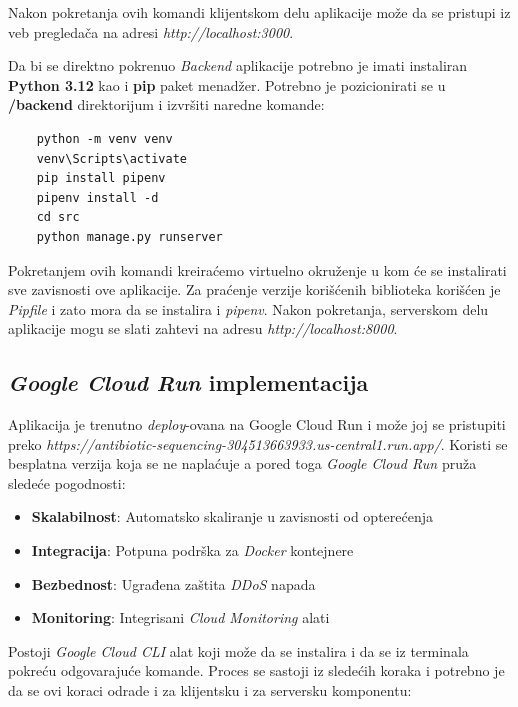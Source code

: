 \documentclass[12pt,oneside]{memoir}
\begin{document}
Nakon pokretanja ovih komandi klijentskom delu aplikacije može da se pristupi iz veb pregledača na adresi \emph{http://localhost:3000}.

Da bi se direktno pokrenuo \emph{Backend} aplikacije potrebno je imati instaliran \textbf{Python 3.12} kao i \textbf{pip} paket menadžer. Potrebno je pozicionirati se u \textbf{/backend} direktorijum i izvršiti naredne komande:  
\begin{verbatim}
    python -m venv venv
    venv\Scripts\activate
    pip install pipenv
    pipenv install -d
    cd src
    python manage.py runserver
\end{verbatim}

Pokretanjem ovih komandi kreiraćemo virtuelno okruženje u kom će se instalirati sve zavisnosti ove aplikacije. Za praćenje verzije korišćenih biblioteka korišćen je \emph{Pipfile} i zato mora da se instalira i \emph{pipenv}.
Nakon pokretanja, serverskom delu aplikacije mogu se slati zahtevi na adresu \emph{http://localhost:8000}.

\subsection{\emph{Google Cloud Run} implementacija}
Aplikacija je trenutno \emph{deploy}-ovana na Google Cloud Run i može joj se pristupiti preko \emph{https://antibiotic-sequencing-304513663933.us-central1.run.app/}.
Koristi se besplatna verzija koja se ne naplaćuje a pored toga \emph{Google Cloud Run} pruža sledeće pogodnosti:

\begin{itemize}
\item \textbf{Skalabilnost}: Automatsko skaliranje u zavisnosti od opterećenja
\item \textbf{Integracija}: Potpuna podrška za \emph{Docker} kontejnere
\item \textbf{Bezbednost}: Ugrađena zaštita \emph{DDoS} napada
\item \textbf{Monitoring}: Integrisani \emph{Cloud Monitoring} alati
\end{itemize}

Postoji \emph{Google Cloud CLI} alat koji može da se instalira i da se iz terminala pokreću odgovarajuće komande. Proces se sastoji iz sledećih koraka i potrebno je da se ovi koraci odrade i za klijentsku i za serversku komponentu:
\end{document}
